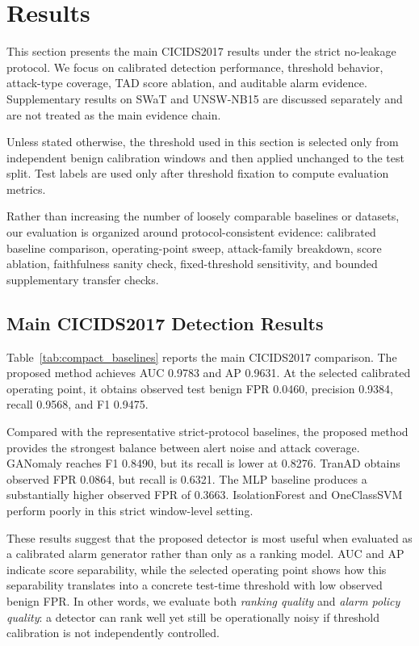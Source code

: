 \section{Results}
\label{sec:results}

This section presents the main CICIDS2017 results under the strict no-leakage protocol. We focus on calibrated detection performance, threshold behavior, attack-type coverage, TAD score ablation, and auditable alarm evidence. Supplementary results on SWaT and UNSW-NB15 are discussed separately and are not treated as the main evidence chain.

Unless stated otherwise, the threshold used in this section is selected only from independent benign calibration windows and then applied unchanged to the test split. Test labels are used only after threshold fixation to compute evaluation metrics.

Rather than increasing the number of loosely comparable baselines or datasets, our evaluation is organized around protocol-consistent evidence: calibrated baseline comparison, operating-point sweep, attack-family breakdown, score ablation, faithfulness sanity check, fixed-threshold sensitivity, and bounded supplementary transfer checks.



\subsection{Main CICIDS2017 Detection Results}

Table~\ref{tab:compact_baselines} reports the main CICIDS2017 comparison. The proposed method achieves AUC 0.9783 and AP 0.9631. At the selected calibrated operating point, it obtains observed test benign FPR 0.0460, precision 0.9384, recall 0.9568, and F1 0.9475.

Compared with the representative strict-protocol baselines, the proposed method provides the strongest balance between alert noise and attack coverage. GANomaly reaches F1 0.8490, but its recall is lower at 0.8276. TranAD obtains observed FPR 0.0864, but recall is 0.6321. The MLP baseline produces a substantially higher observed FPR of 0.3663. IsolationForest and OneClassSVM perform poorly in this strict window-level setting.

These results suggest that the proposed detector is most useful when evaluated as a calibrated alarm generator rather than only as a ranking model. AUC and AP indicate score separability, while the selected operating point shows how this separability translates into a concrete test-time threshold with low observed benign FPR. In other words, we evaluate both \emph{ranking quality} and \emph{alarm policy quality}: a detector can rank well yet still be operationally noisy if threshold calibration is not independently controlled.


